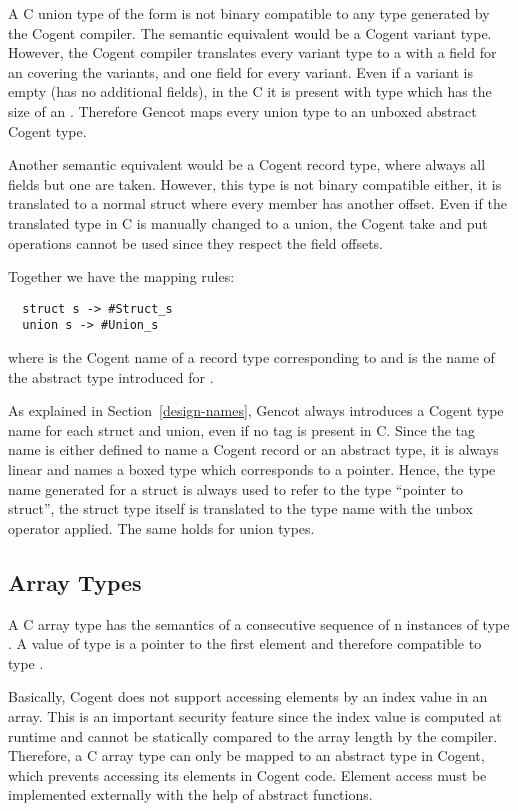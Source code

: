 A C union type of the form  is not binary compatible to any type generated by the Cogent compiler.
The semantic equivalent would be a Cogent variant type. However, the Cogent compiler translates every variant type
to a  with a field for an  covering the variants, and one field for every variant. Even if a variant
is empty (has no additional fields), in the C  it is present with type  which
has the size of an . Therefore Gencot maps every union type to an unboxed abstract Cogent type.

Another semantic equivalent would be a Cogent record type, where always all fields but one are taken. However,
this type is not binary compatible either, it is translated to a normal struct where every member has another
offset. Even if the translated type in C is manually changed to a union, the Cogent take and put operations cannot
be used since they respect the field offsets. 

Together we have the mapping rules:
\begin{verbatim}
  struct s -> #Struct_s
  union s -> #Union_s
\end{verbatim}
where  is the Cogent name of a record type corresponding to  and  is the
name of the abstract type introduced for .

As explained in Section~\ref{design-names}, Gencot always introduces a Cogent type name for each struct and union,
even if no tag is present in C. Since the tag name is either defined to name a Cogent record or an abstract type,
it is always linear and names a boxed type which corresponds to a pointer. Hence, the type name generated for a struct
is always used to refer to the type ``pointer to struct'', the struct type itself is translated to the type name 
with the unbox operator applied. The same holds for union types.

\subsection{Array Types}
\label{design-types-array}

A C array type  has the semantics of a consecutive sequence of n instances of type . A value
of type  is a pointer to the first element and therefore compatible to type .

Basically, Cogent does not support accessing elements by an index value in an array. 
This is an important security feature since the index value is computed at runtime and cannot be statically 
compared to the array length by the compiler. Therefore, a C array type can only be mapped to an abstract type 
in Cogent, which prevents accessing its elements in Cogent code. Element access must be implemented externally 
with the help of abstract functions.

